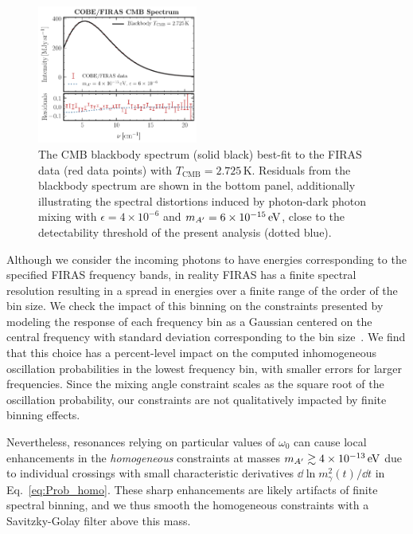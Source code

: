 \documentclass[prd,aps,10pt,nofootinbib,twocolumn,superscriptaddress,preprintnumbers,balancelastpage,longbibliography]{revtex4-1}
\begin{document}
%
\begin{figure}[tbp]
    \centering
    \includegraphics[width=0.47\textwidth]{plots/firas_bb}
    \caption{The CMB blackbody spectrum (solid black) best-fit to the FIRAS data (red data points) with $T_\mathrm{CMB}=2.725$\,K\@. Residuals from the blackbody spectrum are shown in the bottom panel, additionally illustrating the spectral distortions induced by photon-dark photon mixing with $\epsilon=4\times 10^{-6}$ and $\mAp = \SI{6e-15}{\eV}$, close to the detectability threshold of the present analysis (dotted blue). } 
    \label{fig:firas_blackbody}
\end{figure}
%

Although we consider the incoming photons to have energies corresponding to the specified FIRAS frequency bands, in reality FIRAS has a finite spectral resolution resulting in a spread in energies over a finite range of the order of the bin size. We check the impact of this binning on the constraints presented by modeling the response of each frequency bin as a Gaussian centered on the central frequency with standard deviation corresponding to the bin size~\cite{Fixsen:1998js}. We find that this choice has a percent-level impact on the computed inhomogeneous oscillation probabilities in the lowest frequency bin, with smaller errors for larger frequencies. Since the mixing angle constraint scales as the square root of the oscillation probability, our constraints are not qualitatively impacted by finite binning effects.

Nevertheless, resonances relying on particular values of $\omega_0$ can cause local enhancements in the \emph{homogeneous} constraints at masses $\mAp \gtrsim \SI{4e-13}{\eV}$ due to individual crossings with small characteristic derivatives $\dd\ln m_{\gamma}^{2}(t)/\dd t$ in Eq.~\eqref{eq:Prob_homo}. These sharp enhancements are likely artifacts of finite spectral binning, and we thus smooth the homogeneous constraints with a Savitzky-Golay filter above this mass.
\end{document}
